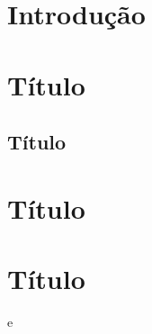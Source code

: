 \documentclass[article,	12pt, oneside,	a4paper,  section = TITLE,  brazil]{abntex2}
\begin{document}
\maketitle  
\frenchspacing 
{}



\section{\textbf{Introdução}}

\lipsum[1] 


\section{\textbf{Título}}

\lipsum[1] 


    \subsection{\textbf{Título}}

\lipsum[1] 


\section{\textbf{Título}}

\lipsum[1] 


\section{\textbf{Título}}

\lipsum[1]  \cite{stockhammer2008nairu} e 




\end{document}

